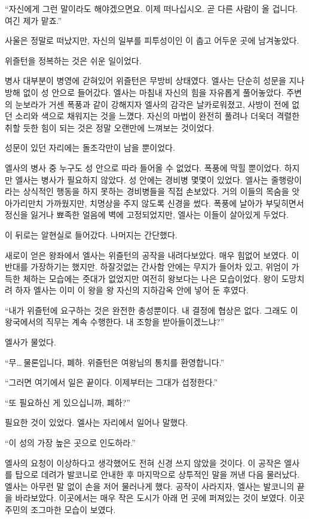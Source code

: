 ``자신에게 그런 말이라도 해야겠으면요. 이제 떠나십시오. 곧 다른 사람이 올 겁니다. 여긴 제가 맡죠.''

사울은 정말로 떠났지만, 자신의 일부를 피투성이인 이 춥고 어두운 곳에 남겨놓았다.

\textbreak

위즐턴을 정복하는 것은 쉬운 일이었다.

병사 대부분이 병영에 갇혀있어 위즐턴은 무방비 상태였다. 엘사는 단순히 성문을 지나 방해 없이 성 안으로 들어갔다. 엘사는 마침내 자신의 힘을 자유롭게 풀어놓았다. 주변의 눈보라가 거센 폭풍과 같이 강해지자 엘사의 감각은 날카로워졌고, 사방이 전에 없던 소리와 색으로 채워지는 것을 느꼈다. 자신의 마법이 완전히 풀려나 더욱더 격렬한 취할 듯한 힘이 되는 것은 정말 오랜만에 느껴보는 것이었다.

성문이 있던 자리에는 돌조각만이 남을 뿐이었다.

엘사의 병사 중 누구도 성 안으로 따라 들어올 수 없었다. 폭풍에 막힐 뿐이었다. 하지만 엘사는 병사가 필요하지 않았다. 성 안에는 경비병 몇몇이 있었다. 엘사는 줄행랑이라는 상식적인 행동을 하지 못하는 경비병들을 직접 손보았다. 거의 이들의 목숨을 앗아가리만치 가까웠지만, 치명상을 주지 않도록 신경을 썼다. 폭풍에 날아가 부딪히면서 정신을 잃거나 뾰족한 얼음에 벽에 고정되었지만, 엘사는 이들이 살아있게 두었다.

이 뒤로는 알현실로 들어갔다. 나머지는 간단했다.

새로이 얻은 왕좌에서 엘사는 위즐턴의 공작을 내려다보았다. 매우 힘없어 보였다. 이 반대를 가장하기는 했지만. 하잘것없는 간사함 안에는 무지가 들어차 있고, 위엄이 가득한 체하는 모습에는 줏대가 없었지만 여전히 왕보다는 나은 모습이었다. 왕이 도망치려 하자 엘사는 이미 이 왕을 왕 자신의 지하감옥 안에 넣어 둔 후였다.

``내가 위즐턴에 요구하는 것은 완전한 충성뿐이다. 내 결정에 협상은 없다. 그래도 이 왕국에서의 직무는 계속 수행한다. 내 조항을 받아들이겠느냐?''

엘사가 물었다.

``무\ldots\,물론입니다, 폐하. 위즐턴은 여왕님의 통치를 환영합니다.''

``그러면 여기에서 일은 끝이다. 이제부터는 그대가 섭정한다.''

``또 필요하신 게 있으십니까, 폐하?''

필요한 것이 있었다. 엘사는 자리에서 일어나 말했다.

``이 성의 가장 높은 곳으로 인도하라.''

엘사의 요청이 이상하다고 생각했어도 전혀 신경 쓰지 않았을 것이다. 이 공작은 엘사를 탑으로 데려가 발코니로 안내한 후 마지막으로 상투적인 말을 꺼낸 다음 물러났다. 엘사는 아무런 말 없이 손을 저어 물러나게 했다. 공작이 사라지자, 엘사는 발코니의 끝을 바라보았다. 이곳에서는 매우 작은 도시가 아래 먼 곳에 퍼져있는 것이 보였다. 이곳 주민의 조그마한 모습이 보였다.

